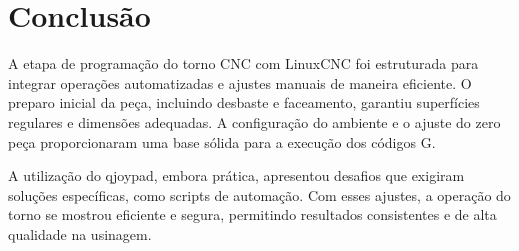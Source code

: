 \documentclass[twoside,a4paper]{refart}
\begin{document}
\section{Conclusão}

A etapa de programação do torno CNC com LinuxCNC foi estruturada para integrar operações automatizadas e ajustes manuais de maneira eficiente. O preparo inicial da peça, incluindo desbaste e faceamento, garantiu superfícies regulares e dimensões adequadas. A configuração do ambiente e o ajuste do zero peça proporcionaram uma base sólida para a execução dos códigos G.

A utilização do qjoypad, embora prática, apresentou desafios que exigiram soluções específicas, como scripts de automação. Com esses ajustes, a operação do torno se mostrou eficiente e segura, permitindo resultados consistentes e de alta qualidade na usinagem.
\end{document}
